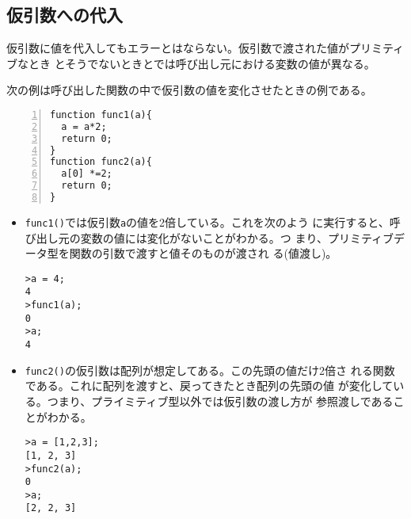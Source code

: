 \subsection{仮引数への代入}
\renewcommand{\theFancyVerbLine}{\normalsize\arabic{FancyVerbLine}}
仮引数に値を代入してもエラーとはならない。仮引数で渡された値がプリミティブなとき
とそうでないときとでは呼び出し元における変数の値が異なる。
\begin{Exec}\label{Params}\upshape
 次の例は呼び出した関数の中で仮引数の値を変化させたときの例である。
\begin{Verbatim}[numbers=left]
function func1(a){
  a = a*2;
  return 0;
}
function func2(a){
  a[0] *=2;
  return 0;
}
\end{Verbatim}
\end{Exec}
\begin{itemize}
 \item \Verb+func1()+では仮引数\Verb+a+の値を2倍している。これを次のよう
       に実行すると、呼び出し元の変数の値には変化がないことがわかる。つ
       まり、プリミティブデータ型を関数の引数で渡すと値そのものが渡され
       る(値渡し)。
\begin{Verbatim}
>a = 4;
4
>func1(a);
0
>a;
4
\end{Verbatim}
 \item \Verb+func2()+の仮引数は配列が想定してある。この先頭の値だけ2倍さ
       れる関数である。これに配列を渡すと、戻ってきたとき配列の先頭の値
       が変化している。つまり、プライミティブ型以外では仮引数の渡し方が
       参照渡しであることがわかる。
\begin{Verbatim}
>a = [1,2,3];
[1, 2, 3]
>func2(a);
0
>a;
[2, 2, 3]
\end{Verbatim}
\end{itemize}
\iffalse
